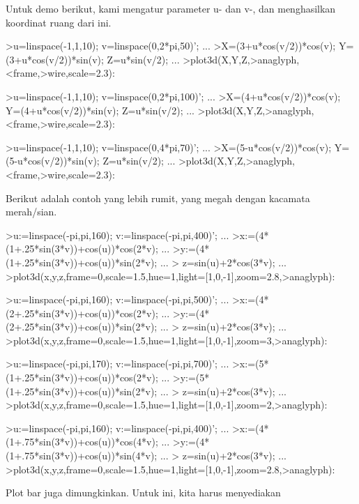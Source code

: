 \documentclass{article}
\begin{document}
\begin{eulernotebook}
\begin{eulercomment}
Untuk demo berikut, kami mengatur parameter u- dan v-, dan
menghasilkan koordinat ruang dari ini.
\end{eulercomment}
\begin{eulerprompt}
>u=linspace(-1,1,10); v=linspace(0,2*pi,50)'; ...
>X=(3+u*cos(v/2))*cos(v); Y=(3+u*cos(v/2))*sin(v); Z=u*sin(v/2); ...
>plot3d(X,Y,Z,>anaglyph,<frame,>wire,scale=2.3):
\end{eulerprompt}
\begin{eulerprompt}
>u=linspace(-1,1,10); v=linspace(0,2*pi,100)'; ...
>X=(4+u*cos(v/2))*cos(v); Y=(4+u*cos(v/2))*sin(v); Z=u*sin(v/2); ...
>plot3d(X,Y,Z,>anaglyph,<frame,>wire,scale=2.3):
\end{eulerprompt}
\begin{eulerprompt}
>u=linspace(-1,1,10); v=linspace(0,4*pi,70)'; ...
>X=(5-u*cos(v/2))*cos(v); Y=(5-u*cos(v/2))*sin(v); Z=u*sin(v/2); ...
>plot3d(X,Y,Z,>anaglyph,<frame,>wire,scale=2.3):
\end{eulerprompt}
\begin{eulercomment}
Berikut adalah contoh yang lebih rumit, yang megah dengan kacamata
merah/sian.
\end{eulercomment}
\begin{eulerprompt}
>u:=linspace(-pi,pi,160); v:=linspace(-pi,pi,400)';  ...
>x:=(4*(1+.25*sin(3*v))+cos(u))*cos(2*v); ...
>y:=(4*(1+.25*sin(3*v))+cos(u))*sin(2*v); ...
> z=sin(u)+2*cos(3*v); ...
>plot3d(x,y,z,frame=0,scale=1.5,hue=1,light=[1,0,-1],zoom=2.8,>anaglyph):
\end{eulerprompt}
\begin{eulerprompt}
>u:=linspace(-pi,pi,160); v:=linspace(-pi,pi,500)';  ...
>x:=(4*(2+.25*sin(3*v))+cos(u))*cos(2*v); ...
>y:=(4*(2+.25*sin(3*v))+cos(u))*sin(2*v); ...
> z=sin(u)+2*cos(3*v); ...
>plot3d(x,y,z,frame=0,scale=1.5,hue=1,light=[1,0,-1],zoom=3,>anaglyph):
\end{eulerprompt}
\begin{eulerprompt}
>u:=linspace(-pi,pi,170); v:=linspace(-pi,pi,700)';  ...
>x:=(5*(1+.25*sin(3*v))+cos(u))*cos(2*v); ...
>y:=(5*(1+.25*sin(3*v))+cos(u))*sin(2*v); ...
> z=sin(u)+2*cos(3*v); ...
>plot3d(x,y,z,frame=0,scale=1.5,hue=1,light=[1,0,-1],zoom=2,>anaglyph):
\end{eulerprompt}
\begin{eulerprompt}
>u:=linspace(-pi,pi,160); v:=linspace(-pi,pi,400)';  ...
>x:=(4*(1+.75*sin(3*v))+cos(u))*cos(4*v); ...
>y:=(4*(1+.75*sin(3*v))+cos(u))*sin(4*v); ...
> z=sin(u)+2*cos(3*v); ...
>plot3d(x,y,z,frame=0,scale=1.5,hue=1,light=[1,0,-1],zoom=2.8,>anaglyph):
\end{eulerprompt}
\begin{eulercomment}
Plot bar juga dimungkinkan. Untuk ini, kita harus menyediakan


\end{eulercomment}
\end{eulernotebook}
\end{document}
